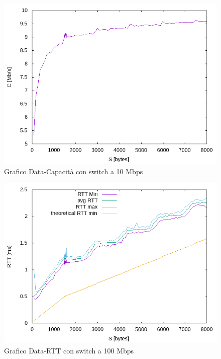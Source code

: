 \documentclass{exam}
\begin{document}
\begin{figure}[H]
	\centering
	\includegraphics[scale = 0.75]{Si_Switch/speed-10Mbps.png}
	\caption{Grafico Data-Capacità con switch a 10 Mbps}
	\label{fig:3.1Speed}
\end{figure}
\begin{figure}[h!]
	\centering
	\includegraphics[scale = 0.75]{Si_Switch/RTT-100Mbps.png}
	\caption{Grafico Data-RTT con switch a 100 Mbps}
	\label{fig:3.2RTT}
\end{figure}
\end{document}
